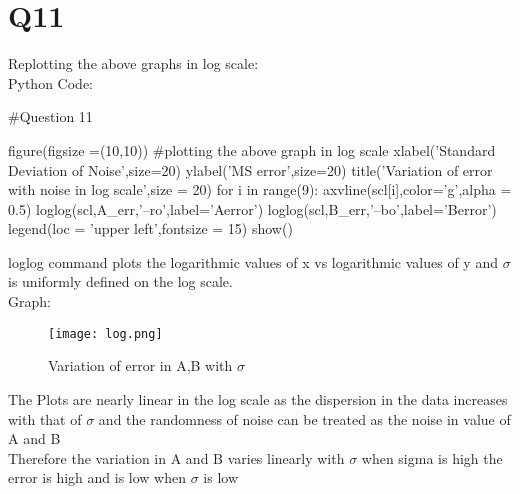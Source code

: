\documentclass[12pt, a4paper]{report}
\begin{document}
\section*{Q11}
Replotting the above graphs in log scale:\\
Python Code:
\begin{py_code}
#Question 11

figure(figsize =(10,10))   #plotting the above graph in log scale 
xlabel('Standard Deviation of Noise',size=20)
ylabel('MS error',size=20)
title('Variation of error with noise in log scale',size = 20)
for i in range(9):
    axvline(scl[i],color='g',alpha = 0.5)
loglog(scl,A_err,'--ro',label='Aerror')
loglog(scl,B_err,'--bo',label='Berror')
legend(loc = 'upper left',fontsize = 15)
show()
\end{py_code}
loglog command plots the logarithmic values of x vs logarithmic values of y and $\sigma$ is uniformly defined on the log scale.\\
Graph:
\begin{figure}[H]
	\centering
	\texttt{[image: log.png]}  %
	\caption{Variation of error in A,B with $\sigma$}
	\label{fig:log}
\end{figure} 
The Plots are nearly linear in the log scale as the dispersion in the data increases with that of $\sigma$ and the randomness of noise can be treated as the noise in value of A and B \\
Therefore the variation in A and B varies linearly with $\sigma$ when sigma is high the error is high and is low when $\sigma$ is low  
 
\end{document}
